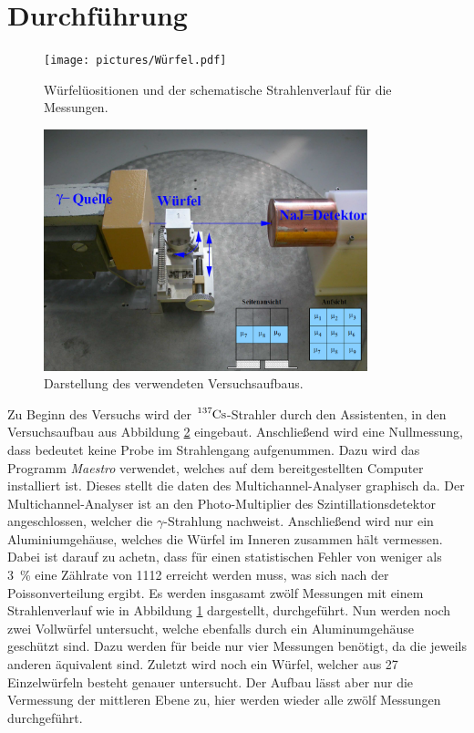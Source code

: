 \newpage
\section{Durchführung}
\label{sec:Durchführung}

\begin{figure}[htb]
  \centering
  \texttt{[image: pictures/Würfel.pdf]}
  \caption{Würfelüositionen und der schematische Strahlenverlauf für die Messungen.}
  \label{fig:wuerfel}
\end{figure}

\begin{figure}[htb]
  \centering
  \includegraphics[height=7.0cm]{content/pictures/Aufbau.png}
  \caption{Darstellung des verwendeten Versuchsaufbaus.\cite{anleitung}}
  \label{fig:Aufbau}
\end{figure}
Zu Beginn des Versuchs wird der $\ce{^137Cs}$-Strahler durch den Assistenten, in den Versuchsaufbau aus Abbildung \ref{fig:Aufbau} eingebaut. 
Anschließend wird eine Nullmessung, dass bedeutet keine Probe im Strahlengang
aufgenummen. Dazu wird das Programm \textit{Maestro} verwendet, welches auf dem bereitgestellten Computer installiert ist. Dieses stellt die daten des 
Multichannel-Analyser graphisch da. Der Multichannel-Analyser ist an den Photo-Multiplier des Szintillationsdetektor angeschlossen, welcher die $\gamma$-Strahlung nachweist.
Anschließend wird nur ein Aluminiumgehäuse, welches die Würfel im Inneren zusammen hält vermessen. Dabei ist darauf zu achetn, dass für einen statistischen Fehler
von weniger als \SI{3}{\percent} eine Zählrate von \num{1112} erreicht werden muss, was sich nach der Poissonverteilung ergibt. Es werden insgasamt
zwölf Messungen mit einem Strahlenverlauf wie in Abbildung \ref{fig:wuerfel} dargestellt, durchgeführt.
Nun werden noch zwei Vollwürfel untersucht, welche ebenfalls durch ein Aluminumgehäuse geschützt sind. Dazu werden für beide nur vier Messungen benötigt,
da die jeweils anderen äquivalent sind.
Zuletzt wird noch ein Würfel, welcher aus \num{27} Einzelwürfeln besteht genauer untersucht. Der Aufbau lässt aber nur die Vermessung der mittleren Ebene zu, hier werden 
wieder alle zwölf Messungen durchgeführt.
\FloatBarrier